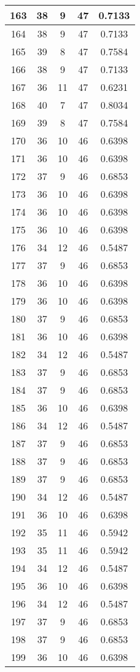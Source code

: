 \documentclass[letterpaper, 12pt]{article}
\begin{document}
\begin{longtable}{|c|c|c|c|c|}
\hline
163 & 38 & 9 & 47 & 0.7133 \\
\hline
164 & 38 & 9 & 47 & 0.7133 \\
\hline
165 & 39 & 8 & 47 & 0.7584 \\
\hline
166 & 38 & 9 & 47 & 0.7133 \\
\hline
167 & 36 & 11 & 47 & 0.6231 \\
\hline
168 & 40 & 7 & 47 & 0.8034 \\
\hline
169 & 39 & 8 & 47 & 0.7584 \\
\hline
170 & 36 & 10 & 46 & 0.6398 \\
\hline
171 & 36 & 10 & 46 & 0.6398 \\
\hline
172 & 37 & 9 & 46 & 0.6853 \\
\hline
173 & 36 & 10 & 46 & 0.6398 \\
\hline
174 & 36 & 10 & 46 & 0.6398 \\
\hline
175 & 36 & 10 & 46 & 0.6398 \\
\hline
176 & 34 & 12 & 46 & 0.5487 \\
\hline
177 & 37 & 9 & 46 & 0.6853 \\
\hline
178 & 36 & 10 & 46 & 0.6398 \\
\hline
179 & 36 & 10 & 46 & 0.6398 \\
\hline
180 & 37 & 9 & 46 & 0.6853 \\
\hline
181 & 36 & 10 & 46 & 0.6398 \\
\hline
182 & 34 & 12 & 46 & 0.5487 \\
\hline
183 & 37 & 9 & 46 & 0.6853 \\
\hline
184 & 37 & 9 & 46 & 0.6853 \\
\hline
185 & 36 & 10 & 46 & 0.6398 \\
\hline
186 & 34 & 12 & 46 & 0.5487 \\
\hline
187 & 37 & 9 & 46 & 0.6853 \\
\hline
188 & 37 & 9 & 46 & 0.6853 \\
\hline
189 & 37 & 9 & 46 & 0.6853 \\
\hline
190 & 34 & 12 & 46 & 0.5487 \\
\hline
191 & 36 & 10 & 46 & 0.6398 \\
\hline
192 & 35 & 11 & 46 & 0.5942 \\
\hline
193 & 35 & 11 & 46 & 0.5942 \\
\hline
194 & 34 & 12 & 46 & 0.5487 \\
\hline
195 & 36 & 10 & 46 & 0.6398 \\
\hline
196 & 34 & 12 & 46 & 0.5487 \\
\hline
197 & 37 & 9 & 46 & 0.6853 \\
\hline
198 & 37 & 9 & 46 & 0.6853 \\
\hline
199 & 36 & 10 & 46 & 0.6398 \\
\hline
\end{longtable}
\end{document}

